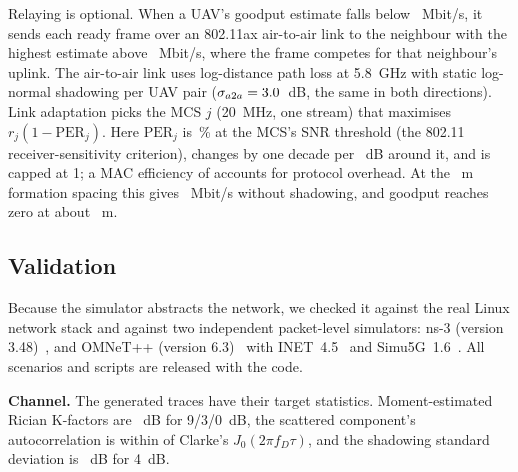 \documentclass[journal,twocolumn,10pt]{IEEEtran}
\begin{document}
Relaying is optional. When a UAV's goodput estimate falls below \RelayThresholdMbps~Mbit/s, it sends each ready frame over an 802.11ax air-to-air link to the neighbour with the highest estimate above \RelayNeighbourMinMbps~Mbit/s, where the frame competes for that neighbour's uplink. The air-to-air link uses log-distance path loss at 5.8~GHz with static log-normal shadowing per UAV pair ($\sigma_{a2a}=3.0$~dB, the same in both directions). Link adaptation picks the MCS $j$ (20~MHz, one stream) that maximises $r_j(1-\mathrm{PER}_j)$. Here $\mathrm{PER}_j$ is \AtwoAPerThreshold\,\% at the MCS's SNR threshold (the 802.11 receiver-sensitivity criterion), changes by one decade per \AtwoAPerSlope~dB around it, and is capped at 1; a MAC efficiency of \AtwoAMacEff{} accounts for protocol overhead. At the \AtwoASpacingM~m formation spacing this gives \AtwoASpacingMbps~Mbit/s without shadowing, and goodput reaches zero at about \AtwoARangeM~m.

\subsection{Validation}\label{sec:validation}
Because the simulator abstracts the network, we checked it against the real Linux network stack and against two independent packet-level simulators: ns-3 (version 3.48)~\cite{riley2010ns3}, and OMNeT++ (version 6.3)~\cite{varga2008omnetpp} with INET~4.5~\cite{meszaros2019inet} and Simu5G~1.6~\cite{nardini2020simu5g}. All scenarios and scripts are released with the code.

\textbf{Channel.} The generated traces have their target statistics. Moment-estimated Rician K-factors are \ValChanKHat~dB for 9/3/0~dB, the scattered component's autocorrelation is within \ValChanClarkeErr{} of Clarke's $J_0(2\pi f_D\tau)$, and the shadowing standard deviation is \ValChanShadowStd~dB for 4~dB.
\end{document}
